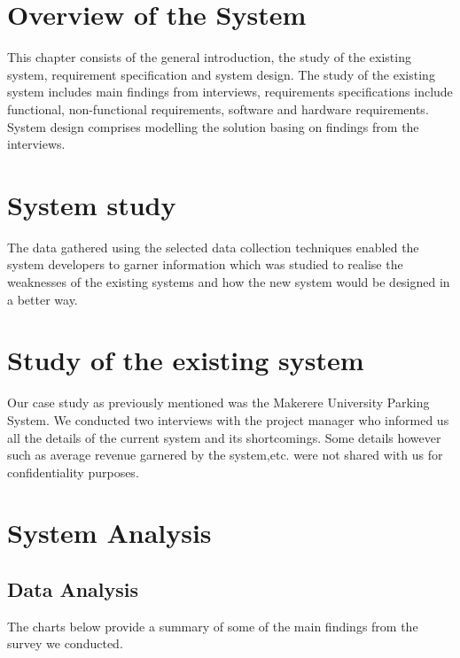 \section{Overview of the System}
This chapter consists of the general introduction, the study of the existing system, requirement specification and system design. The study of the existing system includes main findings from interviews, requirements specifications include functional, non-functional requirements, software and hardware requirements. System design comprises modelling the solution basing on findings from the interviews.


\section{System study}
The data gathered using the selected data collection techniques enabled the system developers to garner information which was studied to realise the weaknesses of the existing systems and how the new system would be designed in a better way.


\section{Study of the existing system}
Our case study as previously mentioned was the Makerere University Parking System. We conducted two interviews with the project manager who informed us all the details of the current system and its shortcomings. Some details however such as average revenue garnered by the system,etc. were not shared with us for confidentiality purposes.


\section{System Analysis}

\subsection{Data Analysis}
The charts below provide a summary of some of the main findings from the survey we conducted.

